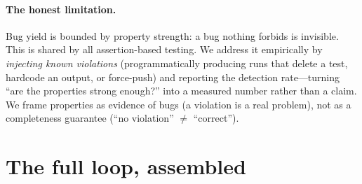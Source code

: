 \documentclass[11pt]{article}
\begin{document}
\paragraph{The honest limitation.} Bug yield is bounded by property strength: a
bug nothing forbids is invisible. This is shared by all assertion-based testing.
We address it empirically by \emph{injecting known violations} (programmatically
producing runs that delete a test, hardcode an output, or force-push) and
reporting the detection rate---turning ``are the properties strong enough?'' into
a measured number rather than a claim. We frame properties as evidence of bugs (a
violation is a real problem), not as a completeness guarantee (``no violation''
$\neq$ ``correct'').

\section{The full loop, assembled}
\label{sec:loop}
\end{document}

